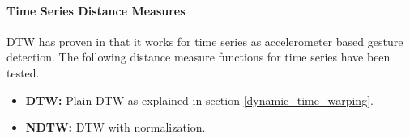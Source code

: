 \paragraph{Time Series Distance Measures} \label{time_series_distance_measures}
DTW has proven in \cite{liu2009uwave} that it works for time series as accelerometer based gesture detection. The
following distance measure functions for time series have been tested.

\begin{itemize}
    \item \textbf{DTW:} Plain DTW as explained in section \ref{dynamic_time_warping}.
    \item \textbf{NDTW:} DTW with normalization.
\end{itemize}
